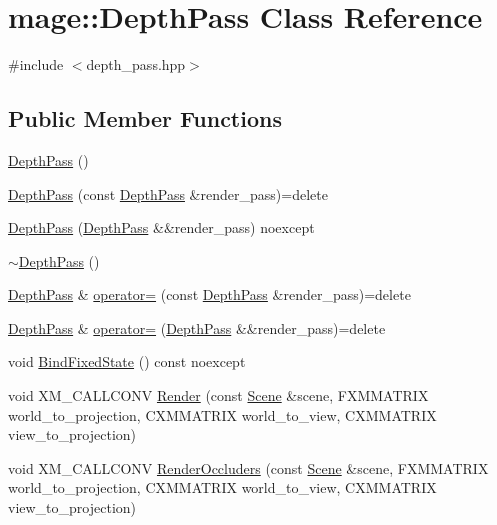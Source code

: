 \hypertarget{classmage_1_1_depth_pass}{}\section{mage\+:\+:Depth\+Pass Class Reference}
\label{classmage_1_1_depth_pass}


{\ttfamily \#include $<$depth\+\_\+pass.\+hpp$>$}

\subsection*{Public Member Functions}
\begin{DoxyCompactItemize}
\item 
\hyperlink{classmage_1_1_depth_pass_a16a23f6820a11faf9195b307474e355b}{Depth\+Pass} ()
\item 
\hyperlink{classmage_1_1_depth_pass_a9f0376b1423404dcced29535d59dd18c}{Depth\+Pass} (const \hyperlink{classmage_1_1_depth_pass}{Depth\+Pass} \&render\+\_\+pass)=delete
\item 
\hyperlink{classmage_1_1_depth_pass_a7f6f3a471223f224492b286d74a59325}{Depth\+Pass} (\hyperlink{classmage_1_1_depth_pass}{Depth\+Pass} \&\&render\+\_\+pass) noexcept
\item 
\hyperlink{classmage_1_1_depth_pass_adc89d5da94b42294316d4ad1dfa09eb4}{$\sim$\+Depth\+Pass} ()
\item 
\hyperlink{classmage_1_1_depth_pass}{Depth\+Pass} \& \hyperlink{classmage_1_1_depth_pass_ac84074238d8ce69251fc2e6f294c5898}{operator=} (const \hyperlink{classmage_1_1_depth_pass}{Depth\+Pass} \&render\+\_\+pass)=delete
\item 
\hyperlink{classmage_1_1_depth_pass}{Depth\+Pass} \& \hyperlink{classmage_1_1_depth_pass_ab6a7d2abf0876f84591328d448ac1203}{operator=} (\hyperlink{classmage_1_1_depth_pass}{Depth\+Pass} \&\&render\+\_\+pass)=delete
\item 
void \hyperlink{classmage_1_1_depth_pass_a9fb46d9ce430864284bb35091855f7ed}{Bind\+Fixed\+State} () const noexcept
\item 
void X\+M\+\_\+\+C\+A\+L\+L\+C\+O\+NV \hyperlink{classmage_1_1_depth_pass_ae3786fa48a3828c8cf5d5bb9a6c33b87}{Render} (const \hyperlink{classmage_1_1_scene}{Scene} \&scene, F\+X\+M\+M\+A\+T\+R\+IX world\+\_\+to\+\_\+projection, C\+X\+M\+M\+A\+T\+R\+IX world\+\_\+to\+\_\+view, C\+X\+M\+M\+A\+T\+R\+IX view\+\_\+to\+\_\+projection)
\item 
void X\+M\+\_\+\+C\+A\+L\+L\+C\+O\+NV \hyperlink{classmage_1_1_depth_pass_ab44669e2a2190a4c1116594604a84458}{Render\+Occluders} (const \hyperlink{classmage_1_1_scene}{Scene} \&scene, F\+X\+M\+M\+A\+T\+R\+IX world\+\_\+to\+\_\+projection, C\+X\+M\+M\+A\+T\+R\+IX world\+\_\+to\+\_\+view, C\+X\+M\+M\+A\+T\+R\+IX view\+\_\+to\+\_\+projection)
\end{DoxyCompactItemize}
